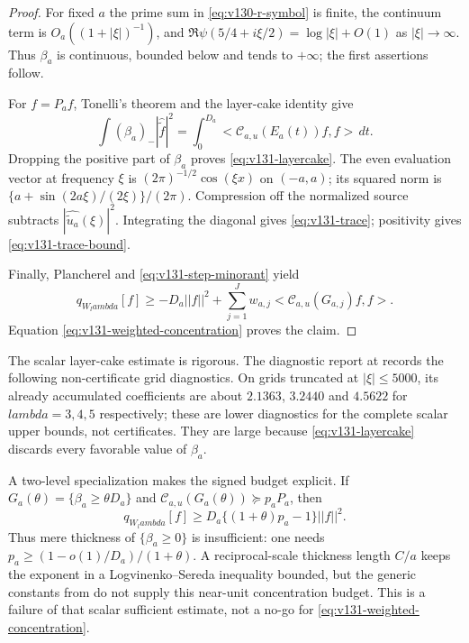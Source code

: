 \documentclass[11pt]{article}
\def\lambda{lambda}%
\def\norm#1{||#1||}%
\def\ip#1#2{<#1,#2>}%
\theoremstyle{remark}
\newcommand{\norm}[1]{\left\lVert #1\right\rVert}
\newcommand{\ip}[2]{\left\langle #1,#2\right\rangle}
\begin{document}
\begin{proof}
For fixed $a$ the prime sum in \eqref{eq:v130-r-symbol} is finite, the
continuum term is $O_a((1+|\xi|)^{-1})$, and
$\Re\psi(5/4+i\xi/2)=\log|\xi|+O(1)$ as $|\xi|\to\infty$.
Thus $\beta_a$ is continuous, bounded below and tends to $+\infty$;
the first assertions follow.

For $f=P_af$, Tonelli's theorem and the layer-cake identity give
\[
 \int(\beta_a)_-|\widehat{\widetilde f}|^2
 =\int_0^{D_a}\ip{\mathcal C_{a,u}(E_a(t))f}f\,dt.
\]
Dropping the positive part of $\beta_a$ proves
\eqref{eq:v131-layercake}.  The even evaluation vector at frequency
$\xi$ is $(2\pi)^{-1/2}\cos(\xi x)$ on $(-a,a)$; its squared norm is
$\{a+\sin(2a\xi)/(2\xi)\}/(2\pi)$.  Compression off the normalized
source subtracts $|\widehat{\widetilde u_a}(\xi)|^2$.  Integrating the
diagonal gives \eqref{eq:v131-trace}; positivity gives
\eqref{eq:v131-trace-bound}.

Finally, Plancherel and \eqref{eq:v131-step-minorant} yield
\[
 q_{W_\lambda}[f]
 \ge -D_a\norm f^2+
       \sum_{j=1}^Jw_{a,j}\ip{\mathcal C_{a,u}(G_{a,j})f}f.
\]
Equation \eqref{eq:v131-weighted-concentration} proves the claim.
\end{proof}

The scalar layer-cake estimate is rigorous. The diagnostic report at  records the following non-certificate grid diagnostics.  On grids truncated at $|\xi|\le5000$, its already accumulated
coefficients are about $2.1363$, $3.2440$ and $4.5622$ for
$\lambda=3,4,5$ respectively; these are lower diagnostics for the
complete scalar upper bounds, not certificates.  They are large
because \eqref{eq:v131-layercake} discards every favorable value of
$\beta_a$.

A two-level specialization makes the signed budget explicit.  If
$G_a(\theta)=\{\beta_a\ge\theta D_a\}$ and
$\mathcal C_{a,u}(G_a(\theta))\succeq p_aP_a$, then
\begin{equation}\label{eq:v131-two-level}
 q_{W_\lambda}[f]
 \ge D_a\{(1+\theta)p_a-1\}\norm f^2.
\end{equation}
Thus mere thickness of $\{\beta_a\ge0\}$ is insufficient: one needs
$p_a\ge(1-o(1)/D_a)/(1+\theta)$.  A reciprocal-scale thickness
length $C/a$ keeps the exponent in a Logvinenko--Sereda inequality
bounded, but the generic constants from
\cite{Kovrijkine2000} do not supply this near-unit concentration
budget.  This is a failure of that scalar sufficient estimate, not a
no-go for \eqref{eq:v131-weighted-concentration}.
\end{document}
